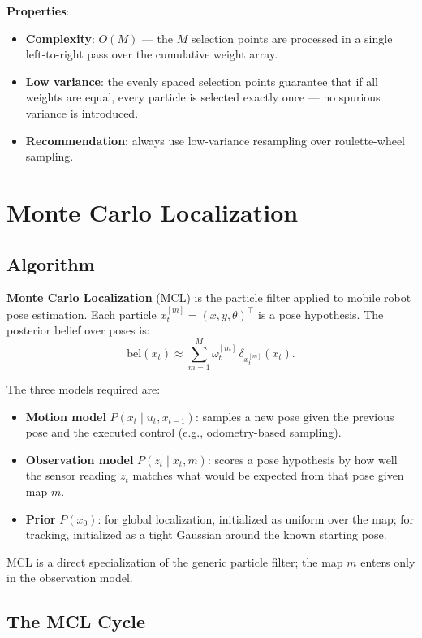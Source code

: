 \documentclass[11pt,a4paper]{article}
\theoremstyle{definition}
\theoremstyle{plain}
\theoremstyle{remark}
\begin{document}
\textbf{Properties}:
\begin{itemize}
    \item \textbf{Complexity}: $O(M)$ — the $M$ selection points are processed in a single left-to-right pass over the cumulative weight array.
    \item \textbf{Low variance}: the evenly spaced selection points guarantee that if all weights are equal, every particle is selected exactly once — no spurious variance is introduced.
    \item \textbf{Recommendation}: always use low-variance resampling over roulette-wheel sampling.
\end{itemize}

\section{Monte Carlo Localization}

\subsection{Algorithm}

\textbf{Monte Carlo Localization} (MCL) is the particle filter applied to mobile robot pose estimation. Each particle $x_t^{[m]} = (x, y, \theta)^\top$ is a pose hypothesis. The posterior belief over poses is:
\[
\mathrm{bel}(x_t) \approx \sum_{m=1}^{M} \omega_t^{[m]}\,\delta_{x_t^{[m]}}(x_t).
\]

The three models required are:
\begin{itemize}
    \item \textbf{Motion model} $P(x_t \mid u_t, x_{t-1})$: samples a new pose given the previous pose and the executed control (e.g., odometry-based sampling).
    \item \textbf{Observation model} $P(z_t \mid x_t, m)$: scores a pose hypothesis by how well the sensor reading $z_t$ matches what would be expected from that pose given map $m$.
    \item \textbf{Prior} $P(x_0)$: for global localization, initialized as uniform over the map; for tracking, initialized as a tight Gaussian around the known starting pose.
\end{itemize}

MCL is a direct specialization of the generic particle filter; the map $m$ enters only in the observation model.

\subsection{The MCL Cycle}
\end{document}
